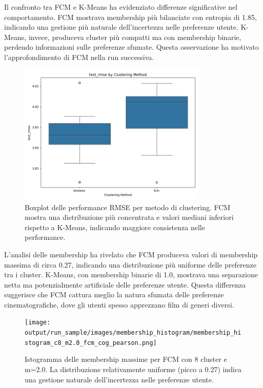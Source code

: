 Il confronto tra FCM e K-Means ha evidenziato differenze significative nel comportamento. FCM mostrava membership più bilanciate con entropia di 1.85, indicando una gestione più naturale dell'incertezza nelle preferenze utente. K-Means, invece, produceva cluster più compatti ma con membership binarie, perdendo informazioni sulle preferenze sfumate. Questa osservazione ha motivato l'approfondimento di FCM nella run successiva.

\begin{figure}[h]
\centering
\includegraphics[width=0.8\textwidth]{output/run_sample/images/comparison/test_rmse/boxplot_test_rmse.png}
\caption{Boxplot delle performance RMSE per metodo di clustering. FCM mostra una distribuzione più concentrata e valori mediani inferiori rispetto a K-Means, indicando maggiore consistenza nelle performance.}
\label{fig:sample_rmse_boxplot}
\end{figure}

L'analisi delle membership ha rivelato che FCM produceva valori di membership massima di circa 0.27, indicando una distribuzione più uniforme delle preferenze tra i cluster. K-Means, con membership binarie di 1.0, mostrava una separazione netta ma potenzialmente artificiale delle preferenze utente. Questa differenza suggerisce che FCM cattura meglio la natura sfumata delle preferenze cinematografiche, dove gli utenti spesso apprezzano film di generi diversi.

\begin{figure}[h]
\centering
\texttt{[image: output/run\_sample/images/membership\_histogram/membership\_histogram\_c8\_m2.0\_fcm\_cog\_pearson.png]}
\caption{Istogramma delle membership massime per FCM con 8 cluster e m=2.0. La distribuzione relativamente uniforme (picco a 0.27) indica una gestione naturale dell'incertezza nelle preferenze utente.}
\label{fig:sample_membership_hist}
\end{figure}

